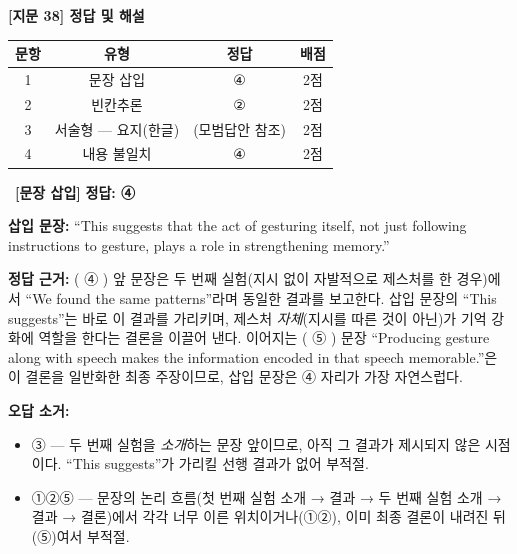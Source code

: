 \documentclass[11pt,a4paper]{article}
\newcommand{\qno}[1]{\par\vspace{10pt}\noindent{\sffamily\bfseries #1.}\ }
\begin{document}
\begin{center}
{\fontsize{15}{17}\selectfont\sffamily\bfseries [지문 38] 정답 및 해설}
\end{center}
\vspace{8pt}

\begin{center}
\renewcommand{\arraystretch}{1.4}
\begin{tabular}{cccc}
\toprule
\textbf{문항} & \textbf{유형} & \textbf{정답} & \textbf{배점} \\
\midrule
1 & 문장 삽입 & ④ & 2점 \\
2 & 빈칸추론 & ② & 2점 \\
3 & 서술형 — 요지(한글) & (모범답안 참조) & 2점 \\
4 & 내용 불일치 & ④ & 2점 \\
\bottomrule
\end{tabular}
\end{center}

\vspace{10pt}

\qno{1}\textbf{[문장 삽입]} \textbf{정답: ④}

\par\vspace{4pt}
\textbf{삽입 문장:} ``This suggests that the act of gesturing itself, not just following instructions to gesture, plays a role in strengthening memory.''

\par\vspace{4pt}
\textbf{정답 근거:} ( ④ ) 앞 문장은 두 번째 실험(지시 없이 자발적으로 제스처를 한 경우)에서 ``We found the same patterns''라며 동일한 결과를 보고한다. 삽입 문장의 ``This suggests''는 바로 이 결과를 가리키며, 제스처 \textit{자체}(지시를 따른 것이 아닌)가 기억 강화에 역할을 한다는 결론을 이끌어 낸다. 이어지는 ( ⑤ ) 문장 ``Producing gesture along with speech makes the information encoded in that speech memorable.''은 이 결론을 일반화한 최종 주장이므로, 삽입 문장은 ④ 자리가 가장 자연스럽다.

\par\vspace{4pt}
\textbf{오답 소거:}
\begin{itemize}[leftmargin=2em,itemsep=2pt]
  \item ③ — 두 번째 실험을 \textit{소개}하는 문장 앞이므로, 아직 그 결과가 제시되지 않은 시점이다. ``This suggests''가 가리킬 선행 결과가 없어 부적절.
  \item ①②⑤ — 문장의 논리 흐름(첫 번째 실험 소개 → 결과 → 두 번째 실험 소개 → 결과 → 결론)에서 각각 너무 이른 위치이거나(①②), 이미 최종 결론이 내려진 뒤(⑤)여서 부적절.
\end{itemize}
\end{document}
